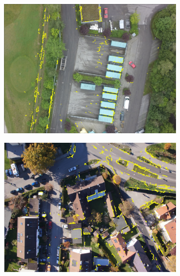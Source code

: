 \begin{figure}[tbp]
\begin{subfigure}[b]{0.243\textwidth}
           \includegraphics[width=\textwidth]{figures_matches/container_Fmatch.jpg}
       \end{subfigure}
       \hfill
       \begin{subfigure}[b]{0.243\textwidth}  
           \centering 
           \includegraphics[width=\textwidth]{figures_matches/eichenau_Fmatch.jpg}
       \end{subfigure}
       \hfill
       \begin{subfigure}[b]{0.243\textwidth}   
           \centering 

\end{subfigure}
\end{figure}
